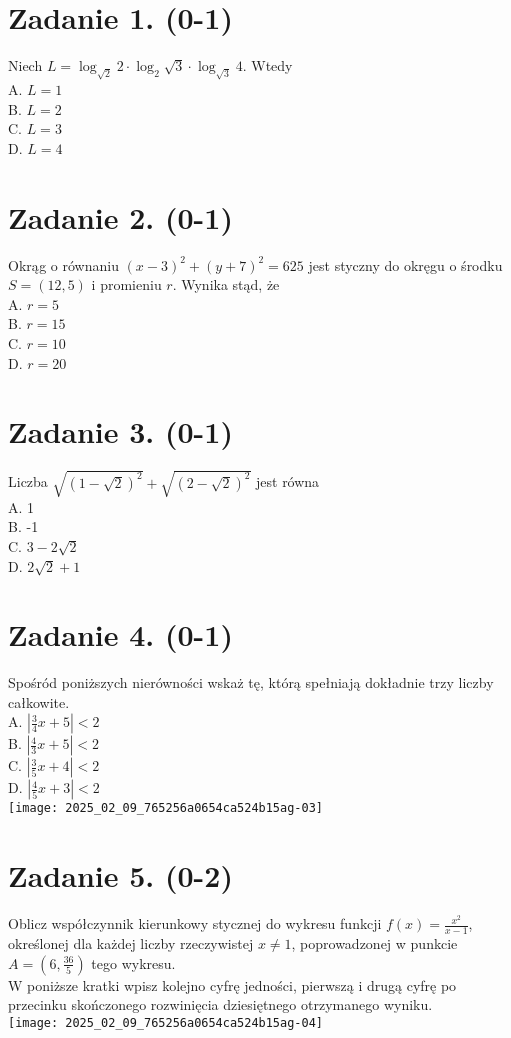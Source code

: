 \documentclass[10pt]{article}
\begin{document}
\section*{Zadanie 1. (0-1)}
Niech \(L=\log _{\sqrt{2}} 2 \cdot \log _{2} \sqrt{3} \cdot \log _{\sqrt{3}} 4\). Wtedy\\
A. \(L=1\)\\
B. \(L=2\)\\
C. \(L=3\)\\
D. \(L=4\)

\section*{Zadanie 2. (0-1)}
Okrąg o równaniu \((x-3)^{2}+(y+7)^{2}=625\) jest styczny do okręgu o środku \(S=(12,5)\) i promieniu \(r\). Wynika stąd, że\\
A. \(r=5\)\\
B. \(r=15\)\\
C. \(r=10\)\\
D. \(r=20\)

\section*{Zadanie 3. (0-1)}
Liczba \(\sqrt{(1-\sqrt{2})^{2}}+\sqrt{(2-\sqrt{2})^{2}}\) jest równa\\
A. 1\\
B. -1\\
C. \(3-2 \sqrt{2}\)\\
D. \(2 \sqrt{2}+1\)

\section*{Zadanie 4. (0-1)}
Spośród poniższych nierówności wskaż tę, którą spełniają dokładnie trzy liczby całkowite.\\
A. \(\left|\frac{3}{4} x+5\right|<2\)\\
B. \(\left|\frac{4}{3} x+5\right|<2\)\\
C. \(\left|\frac{3}{5} x+4\right|<2\)\\
D. \(\left|\frac{4}{5} x+3\right|<2\)\\
\texttt{[image: 2025\_02\_09\_765256a0654ca524b15ag-03]}

\section*{Zadanie 5. (0-2)}
Oblicz współczynnik kierunkowy stycznej do wykresu funkcji \(f(x)=\frac{x^{2}}{x-1}\), określonej dla każdej liczby rzeczywistej \(x \neq 1\), poprowadzonej w punkcie \(A=\left(6, \frac{36}{5}\right)\) tego wykresu.\\
W poniższe kratki wpisz kolejno cyfrę jedności, pierwszą i drugą cyfrę po przecinku skończonego rozwinięcia dziesiętnego otrzymanego wyniku.\\
\texttt{[image: 2025\_02\_09\_765256a0654ca524b15ag-04]}
\end{document}
